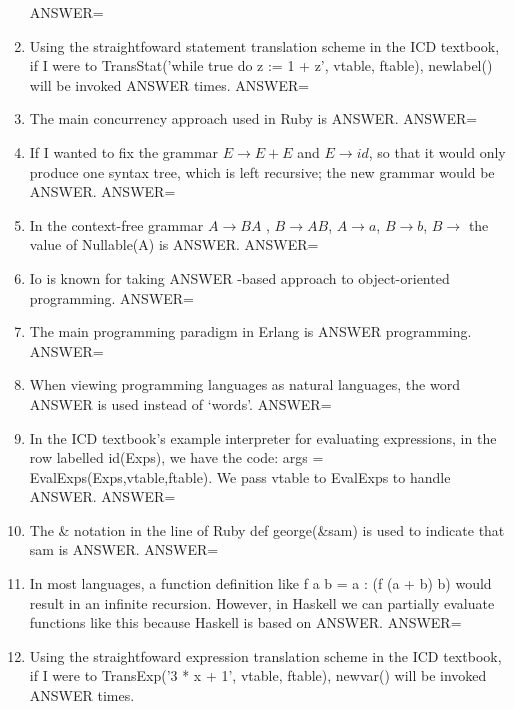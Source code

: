 \documentclass{exam}
\begin{document}
\begin{enumerate}
ANSWER=
\item Using the straightfoward statement translation scheme in the ICD textbook, if I were to TransStat('while true do z := 1 + z', vtable, ftable), newlabel() will be invoked ANSWER times.\newline
ANSWER=
\item The main concurrency approach used in Ruby is ANSWER.\newline
ANSWER=
\item If I wanted to fix the grammar $E \rightarrow E + E$ and $E \rightarrow id$, so that it would only produce one syntax tree, which is left recursive; the new grammar would be ANSWER.\newline
ANSWER=
\item In the context-free grammar $A \rightarrow B A$ , $B \rightarrow A B$, $A \rightarrow a$, $B \rightarrow b$, $B \rightarrow$  the value of Nullable(A) is ANSWER.\newline
ANSWER=
\item Io is known for taking ANSWER -based approach to object-oriented programming.\newline
ANSWER=
\item The main programming paradigm in Erlang is ANSWER programming.\newline
ANSWER=
\item When viewing programming languages as natural languages, the word ANSWER is used instead of `words'.\newline
ANSWER=
\item In the ICD textbook's example interpreter for evaluating expressions, in the row labelled id(Exps), we have the code: args = EvalExps(Exps,vtable,ftable).  We pass vtable to EvalExps to handle ANSWER.\newline
ANSWER=
\item The \& notation in the line of Ruby def george(\&sam) is used to indicate that sam is ANSWER.\newline
ANSWER=
\item In most languages, a function definition like f a b = a : (f (a + b) b) would result in an infinite recursion.  However, in Haskell we can partially evaluate functions like this because Haskell is based on ANSWER.\newline
ANSWER=
\item Using the straightfoward expression translation scheme in the ICD textbook, if I were to TransExp('3 * x + 1', vtable, ftable), newvar() will be invoked ANSWER times.\newline

\end{enumerate}
\end{document}
